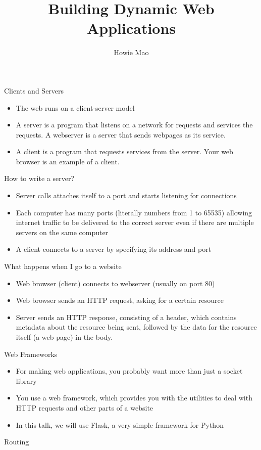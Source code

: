 \documentclass{beamer}
\title{Building Dynamic Web Applications}
\author{Howie Mao}
\begin{document}
\begin{frame}
	\titlepage
\end{frame}

\begin{frame}{Clients and Servers}
	\begin{itemize}
		\item The web runs on a client-server model
		\item A server is a program that listens on a network for requests
			and services the requests. A webserver is a server that sends
			webpages as its service.
		\item A client is a program that requests services from the server.
			Your web browser is an example of a client.
	\end{itemize}
\end{frame}

\begin{frame}{How to write a server?}
	\begin{itemize}
		\item Server calls attaches itself to a port and starts listening 
			for connections
		\item Each computer has many ports (literally numbers from 1 to 65535) 
			allowing internet traffic to be delivered to the correct
			server even if there are multiple servers on the same computer
		\item A client connects to a server by specifying its address and port
	\end{itemize}
\end{frame}

\begin{frame}{What happens when I go to a website}
	\begin{itemize}
		\item Web browser (client) connects to webserver (usually on port 80)
		\item Web browser sends an HTTP request, asking for a certain resource
		\item Server sends an HTTP response, consisting of a header,
			which contains metadata about the resource being sent, followed
			by the data for the resource itself (a web page) in the body.
	\end{itemize}
\end{frame}

\begin{frame}{Web Frameworks}
	\begin{itemize}
		\item For making web applications, you probably want more than just
			a socket library
		\item You use a web framework, which provides you with the utilities
			to deal with HTTP requests and other parts of a website
		\item In this talk, we will use Flask, a very simple framework for Python
	\end{itemize}
\end{frame}

\begin{frame}{Routing}
\end{frame}
\end{document}
